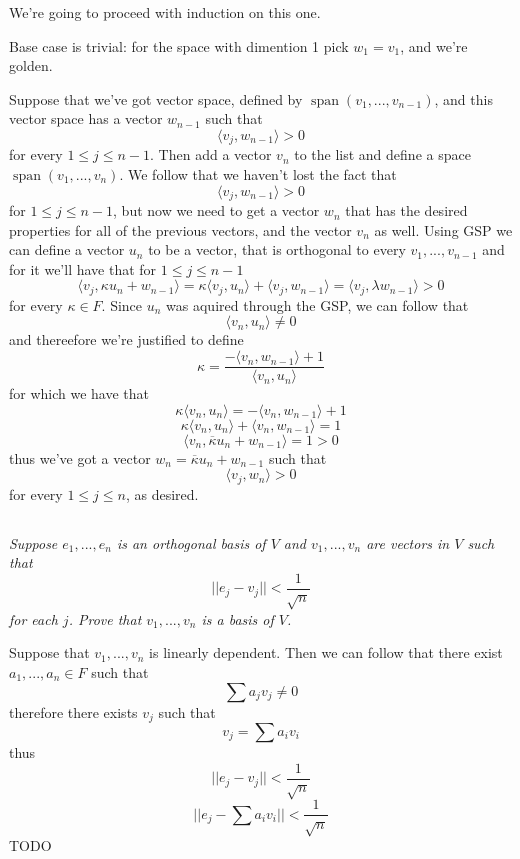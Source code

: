 \documentclass[11pt,oneside,titlepage]{book}
\DeclareMathOperator \Span {span}
\newcommand{\eangle}[1]{\langle #1 \rangle}
\begin{document}
We're going to proceed with induction on this one.

Base case is trivial: for the space with dimention 1 pick $w_1 = v_1$, and we're golden.

Suppose that we've got vector space, defined by $\Span(v_1, ..., v_{n - 1})$, and
this vector space has a vector
$w_{n - 1}$ such that
$$\eangle{v_j, w_{n - 1}} > 0$$
for every $1 \leq j \leq n - 1$. Then add a vector $v_n$ to the list and
define a space $\Span(v_1, ..., v_n)$. We follow that
we haven't lost the fact that
$$\eangle{v_j, w_{n - 1}} > 0$$
for $1 \leq j \leq n - 1$, but now we need to get a vector $w_n$ that
has the desired properties for all of the previous
vectors, and the vector $v_n$ as well. 
Using GSP we can define a vector $u_n$ to be a vector, that is orthogonal to every
$v_1, ..., v_{n - 1}$ and for it we'll have that for $1 \leq j \leq n - 1$
$$\eangle{v_j, \kappa u_n + w_{n - 1}}  = \kappa \eangle{v_j, u_n} + \eangle{v_j, w_{n - 1}} =
\eangle{v_j, \lambda w_{n - 1}} > 0$$
for every $\kappa \in F$. Since $u_n$ was aquired through the GSP, we can follow that
$$\eangle{v_n, u_n} \neq 0$$
and thereefore we're justified to define 
$$\kappa = \frac{- \eangle{v_n, w_{n - 1}} + 1}{\eangle{v_n, u_n}}$$
for which we have that
$$\kappa \eangle{v_n, u_n} = - \eangle{v_n, w_{n - 1}} + 1$$
$$\kappa \eangle{v_n, u_n} + \eangle{v_n, w_{n - 1}} = 1$$
$$ \eangle{v_n, \overline{\kappa} u_n + w_{n - 1}} = 1 > 0$$
thus we've got a vector $w_n  =\overline{\kappa} u_n + w_{n - 1}$ such that
$$\eangle{v_j, w_n} > 0$$
for every $1 \leq j \leq n$, as desired.

\subsection{}

\textit{Suppose $e_1, ..., e_n$ is an orthogonal basis of $V$ and $v_1, ..., v_n$ are vectors
  in $V$ such that}
$$||e_j - v_j|| < \frac {1}{ \sqrt{n}}$$
\textit{for each $j$. Prove that $v_1, ..., v_n$ is a basis of $V$.}

Suppose that $v_1, ..., v_n$ is linearly dependent. Then we can follow that there exist
$a_1, ..., a_n \in F$ such that
$$\sum{a_j v_j} \neq 0$$
therefore there exists $v_j$ such that
$$v_j = \sum{a_i v_i}$$
thus
$$||e_j - v_j||  < \frac{1}{\sqrt{n}}$$
$$||e_j - \sum{a_i v_i}||  < \frac{1}{\sqrt{n}}$$
TODO

\subsection{}
\end{document}
